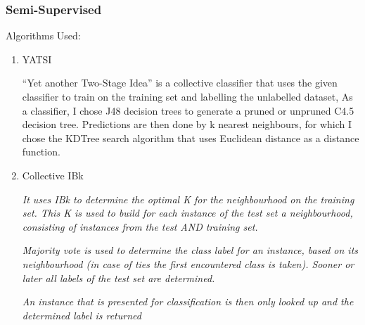 \documentclass[10pt,conference]{IEEEtran}
\begin{document}
\subsubsection{Semi-Supervised}
Algorithms Used:
\begin{enumerate}
    \item YATSI
    
    “Yet another Two-Stage Idea” is a collective classifier that uses the given classifier to train on the training set and labelling the unlabelled dataset, As a classifier, I chose J48 decision trees to generate a pruned or unpruned C4.5 decision tree. Predictions are then done by k nearest neighbours, for which I chose the KDTree search algorithm that uses Euclidean distance as a distance function. \cite{b3}
    \item Collective IBk
    
    \textit{It uses IBk to determine the optimal K for the neighbourhood on the training set. This K is used to build for each instance of the test set a neighbourhood, consisting of instances from the test AND training set.}
    
    \textit{Majority vote is used to determine the class label for an instance, based on its neighbourhood (in case of ties the first encountered class is taken). Sooner or later all labels of the test set are determined.}
    
    \textit{An instance that is presented for classification is then only looked up and the determined label is returned} \cite{b4}

\end{enumerate}
\end{document}
